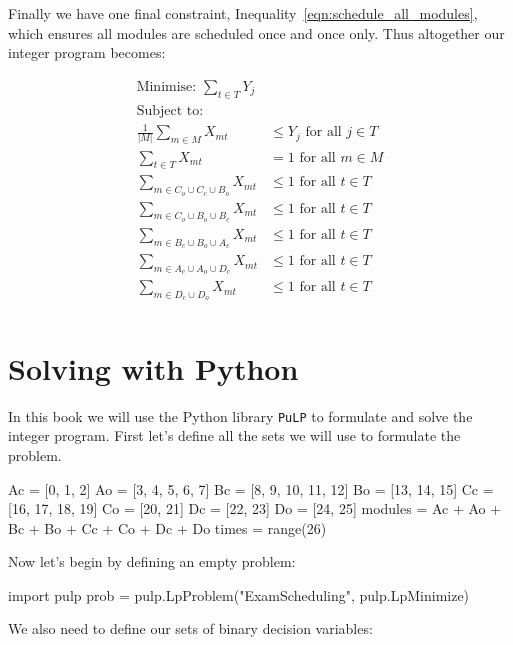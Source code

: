 Finally we have one final constraint, Inequality~\ref{eqn:schedule_all_modules},
which ensures all modules are scheduled once and once only.
Thus altogether our integer program becomes:

\begin{align}
\text{Minimise: } \sum_{t \in T} Y_j & \\\label{eqn:objective}
\text{Subject to: } & \nonumber \\
\frac{1}{|M|} \sum_{m \in M} X_{mt} &\leq Y_j \text{ for all } j \in T\\\label{eqn:auxiliary}
\sum_{t \in T} X_{mt} &= 1 \text{ for all } m \in M\\\label{eqn:schedule_all_modules}
\sum_{m \in C_o \cup C_c \cup B_o} X_{mt} &\leq 1 \text{ for all } t \in T\\\label{eqn:clique1}
\sum_{m \in C_o \cup B_o \cup B_c} X_{mt} &\leq 1 \text{ for all } t \in T\\\label{eqn:clique2}
\sum_{m \in B_c \cup B_o \cup A_c} X_{mt} &\leq 1 \text{ for all } t \in T\\\label{eqn:clique3}
\sum_{m \in A_c \cup A_o \cup D_c} X_{mt} &\leq 1 \text{ for all } t \in T\\\label{eqn:clique4}
\sum_{m \in D_c \cup D_o} X_{mt} & \leq 1 \text{ for all } t \in T\\\label{eqn:clique5}
\end{align}


\section{Solving with Python}\label{sec:solving-with-python}
In this book we will use the Python library \texttt{PuLP} to
formulate and solve the integer program. First let's define all the sets we
will use to formulate the problem.

\begin{pyin}
Ac = [0, 1, 2]
Ao = [3, 4, 5, 6, 7]
Bc = [8, 9, 10, 11, 12]
Bo = [13, 14, 15]
Cc = [16, 17, 18, 19]
Co = [20, 21]
Dc = [22, 23]
Do = [24, 25]
modules = Ac + Ao + Bc + Bo + Cc + Co + Dc + Do
times = range(26)
\end{pyin}

Now let's begin by defining an empty problem:

\begin{pyin}
import pulp
prob = pulp.LpProblem("ExamScheduling", pulp.LpMinimize)
\end{pyin}

We also need to define our sets of binary decision variables:

